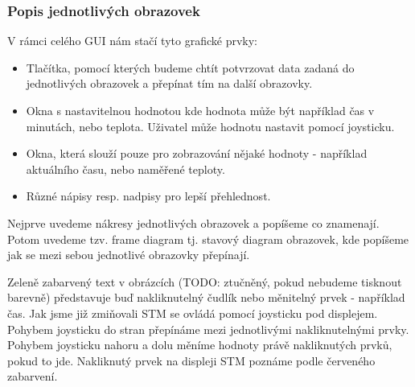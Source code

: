 \subsubsection{Popis jednotlivých obrazovek}

V rámci celého GUI nám stačí tyto grafické prvky:
\begin{itemize}
  \item Tlačítka, pomocí kterých budeme chtít potvrzovat data zadaná do jednotlivých obrazovek
    a přepínat tím na další obrazovky.
  \item Okna s nastavitelnou hodnotou kde hodnota může být například čas v minutách, nebo teplota.
    Uživatel může hodnotu nastavit pomocí joysticku.
  \item Okna, která slouží pouze pro zobrazování nějaké hodnoty - například aktuálního času, nebo
    naměřené teploty.
  \item Různé nápisy resp. nadpisy pro lepší přehlednost.
\end{itemize}

Nejprve uvedeme nákresy jednotlivých obrazovek a popíšeme co znamenají.
Potom uvedeme tzv. frame diagram tj. stavový diagram obrazovek, kde popíšeme jak se mezi sebou
jednotlivé obrazovky přepínají.

Zeleně zabarvený text v obrázcích (TODO: ztučněný, pokud nebudeme tisknout barevně) představuje
buď nakliknutelný čudlík nebo měnitelný prvek - například čas.
Jak jsme již zmiňovali STM se ovládá pomocí joysticku pod displejem.
Pohybem joysticku do stran přepínáme mezi jednotlivými nakliknutelnými prvky.
Pohybem joysticku nahoru a dolu měníme hodnoty právě nakliknutých prvků, pokud to jde.
Nakliknutý prvek na displeji STM poznáme podle červeného zabarvení.

